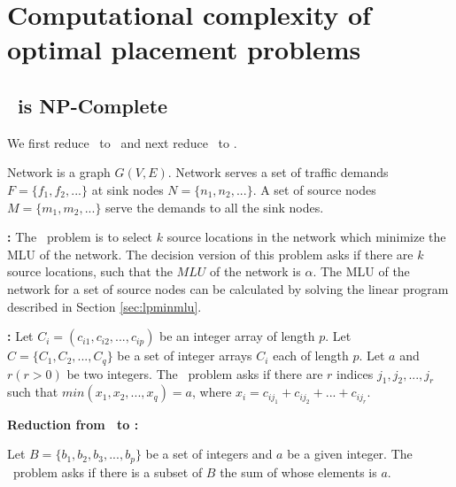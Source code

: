 \section{Computational complexity of optimal placement problems}

\subsection{\optloc\ is NP-Complete}

We first reduce \subsetsum\ to \minsubsetsum\ and next reduce \minsubsetsum\ to \optloc. 

  Network is a graph $G(V, E)$. Network serves a set of traffic demands $F=\{f_1,f_2, ...\}$ at sink nodes $N = \{n_1, n_2, ...\}$. A set of source nodes $M =\{m_1, m_2, ...\}$ serve the demands to all the sink nodes.

\noindent\textbf{\optloc:} The \optloc\ problem is to select $k$ source locations in the network which minimize the MLU of the network. The decision version of this problem asks if there are $k$ source locations, such that the $MLU$ of the network is $\alpha$. The MLU of the network for a set of source nodes can be calculated by solving the linear program described in Section \ref{sec:lpminmlu}. 




\noindent\textbf{\minsubsetsum:} Let $C_i = (c_{i1}, c_{i2}, ..., c_{ip})$ be an integer array of length $p$. Let $C = \{C_1, C_2, ..., C_q\}$ be a set of integer arrays $C_i$ each of length $p$. Let $a$ and $r (r > 0)$  be two integers. The \minsubsetsum\ problem asks if there are $r$ indices $j_1, j_2, ..., j_r$ such that $ \textit{min}(x_1, x_2, ... , x_q) = a$, where $x_i = c_{ij_1} + c_{ij_2} + ... + c_{ij_r}$.

\noindent\textbf{Reduction from \subsetsum\ to \minsubsetsum:} 

Let $B = \{ b_1, b_2, b_3, ..., b_p\}$ be a set of integers and $a$ be a given integer. The \subsetsum\ problem asks if there is a subset of $B$ the sum of whose elements is $a$. 

